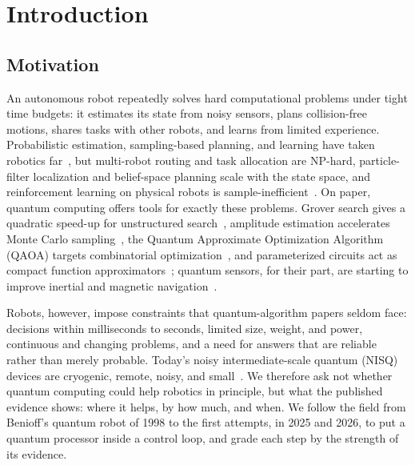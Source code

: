 \documentclass[acmsmall,screen,review]{acmart}
\begin{document}



\maketitle


\section{Introduction}\label{sec:intro}

\subsection{Motivation}\label{sec:motivation}
An autonomous robot repeatedly solves hard computational problems under tight time budgets: it estimates its state from noisy sensors, plans collision-free motions, shares tasks with other robots, and learns from limited experience. Probabilistic estimation, sampling-based planning, and learning have taken robotics far~\cite{Thrun2005,Siciliano2016}, but multi-robot routing and task allocation are NP-hard, particle-filter localization and belief-space planning scale with the state space, and reinforcement learning on physical robots is sample-inefficient~\cite{Kober2013}. On paper, quantum computing offers tools for exactly these problems. Grover search gives a quadratic speed-up for unstructured search~\cite{Grover1996}, amplitude estimation accelerates Monte Carlo sampling~\cite{Montanaro2015}, the Quantum Approximate Optimization Algorithm (QAOA) targets combinatorial optimization~\cite{Farhi2014}, and parameterized circuits act as compact function approximators~\cite{Cerezo2021a}; quantum sensors, for their part, are starting to improve inertial and magnetic navigation~\cite{Degen2017}.

Robots, however, impose constraints that quantum-algorithm papers seldom face: decisions within milliseconds to seconds, limited size, weight, and power, continuous and changing problems, and a need for answers that are reliable rather than merely probable. Today's noisy intermediate-scale quantum (NISQ) devices are cryogenic, remote, noisy, and small~\cite{Preskill2018}. We therefore ask not whether quantum computing could help robotics in principle, but what the published evidence shows: where it helps, by how much, and when. We follow the field from Benioff's quantum robot of 1998 to the first attempts, in 2025 and 2026, to put a quantum processor inside a control loop, and grade each step by the strength of its evidence.
\end{document}
